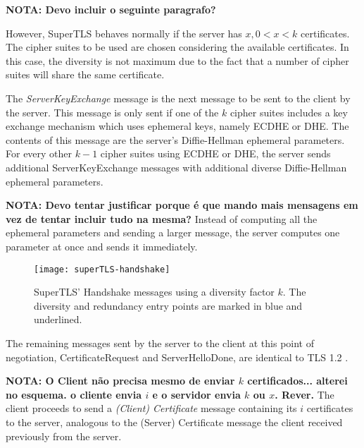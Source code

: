 \documentclass{sig-alternate-05-2015}
\begin{document}
\textbf{NOTA: Devo incluir o seguinte paragrafo?}

However, SuperTLS behaves normally if the server has $x, 0 < x < k$ certificates. The cipher suites to be used are chosen considering the available certificates. In this case, the diversity is not maximum due to the fact that a number of cipher suites will share the same certificate.

The \textit{ServerKeyExchange} message is the next message to be sent to the client by the server. This message is only sent if one of the $k$ cipher suites includes a key exchange mechanism which uses ephemeral keys, namely ECDHE or DHE. The contents of this message are the server's Diffie-Hellman ephemeral parameters. For every other $k - 1$ cipher suites using ECDHE or DHE, the server sends additional ServerKeyExchange messages with additional diverse Diffie-Hellman ephemeral parameters.

\textbf{NOTA: Devo tentar justificar porque \'e que mando mais mensagens em vez de tentar incluir tudo na mesma?}
Instead of computing all the ephemeral parameters and sending a larger message, the server computes one parameter at once and sends it immediately.

\begin{figure}[t]
\texttt{[image: superTLS-handshake]}
\centering
\caption{SuperTLS' Handshake messages using a diversity factor $k$. The diversity and redundancy entry points are marked in blue and underlined.}
\label{fig:superTLS-example}
\end{figure}


The remaining messages sent by the server to the client at this point of negotiation, CertificateRequest and ServerHelloDone, are identical to TLS 1.2 \cite{TLS1.2-5246}.

\textbf{NOTA: O Client n\~ao precisa mesmo de enviar $k$ certificados... alterei no esquema. o cliente envia $i$ e o servidor envia $k$ ou $x$. Rever.}
The client proceeds to send a \textit{(Client) Certificate} message containing its $i$ certificates to the server, analogous to the (Server) Certificate message the client received previously from the server.
\end{document}
